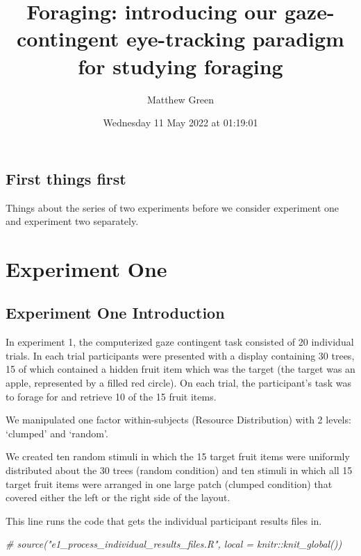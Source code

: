 \documentclass[
]{book}
\title{Foraging: introducing our gaze-contingent eye-tracking paradigm for studying foraging}
\author{Matthew Green}
\date{Wednesday 11 May 2022 at 01:19:01}
\newenvironment{Shaded}{\begin{snugshade}}{\end{snugshade}}
\newcommand{\CommentTok}[1]{\textcolor[rgb]{0.56,0.35,0.01}{\textit{#1}}}
\begin{document}
\maketitle

{
\setcounter{tocdepth}{1}
\tableofcontents
}
\hypertarget{first-things-first}{%
\chapter{First things first}\label{first-things-first}}

Things about the series of two experiments before we consider experiment one and experiment two separately.

\hypertarget{part-experiment-one}{%
\part{Experiment One}\label{part-experiment-one}}

\hypertarget{experiment-one-introduction}{%
\chapter{Experiment One Introduction}\label{experiment-one-introduction}}

In experiment 1, the computerized gaze contingent task consisted of 20 individual trials. In each trial participants were presented with a display containing 30 trees, 15 of which contained a hidden fruit item which was the target (the target was an apple, represented by a filled red circle). On each trial, the participant's task was to forage for and retrieve 10 of the 15 fruit items.

We manipulated one factor within-subjects (Resource Distribution) with 2 levels: `clumped' and `random'.

We created ten random stimuli in which the 15 target fruit items were uniformly distributed about the 30 trees (random condition) and ten stimuli in which all 15 target fruit items were arranged in one large patch (clumped condition) that covered either the left or the right side of the layout.

This line runs the code that gets the individual participant results files in.

\begin{Shaded}
\begin{Highlighting}[]
\CommentTok{\# source("e1\_process\_individual\_results\_files.R", local = knitr::knit\_global())}
\end{Highlighting}
\end{Shaded}
\end{document}
